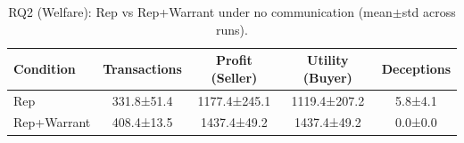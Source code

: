 \begin{table}[!h]
    \centering
    \small
    \caption{RQ2 (Welfare): Rep vs Rep+Warrant under no communication (mean$\pm$std across runs).}
    \label{tab:rq2_welfare_summary}
    \begin{tabular}{lcccc}
    \toprule
    \textbf{Condition} & \textbf{Transactions} & \textbf{Profit (Seller)} & \textbf{Utility (Buyer)} & \textbf{Deceptions} \\
    \midrule
    Rep         & 331.8±51.4 & 1177.4±245.1 & 1119.4±207.2 & 5.8±4.1 \\
    Rep+Warrant & 408.4±13.5 & 1437.4±49.2 & 1437.4±49.2 & 0.0±0.0 \\
    \bottomrule
    \end{tabular}
\end{table}
